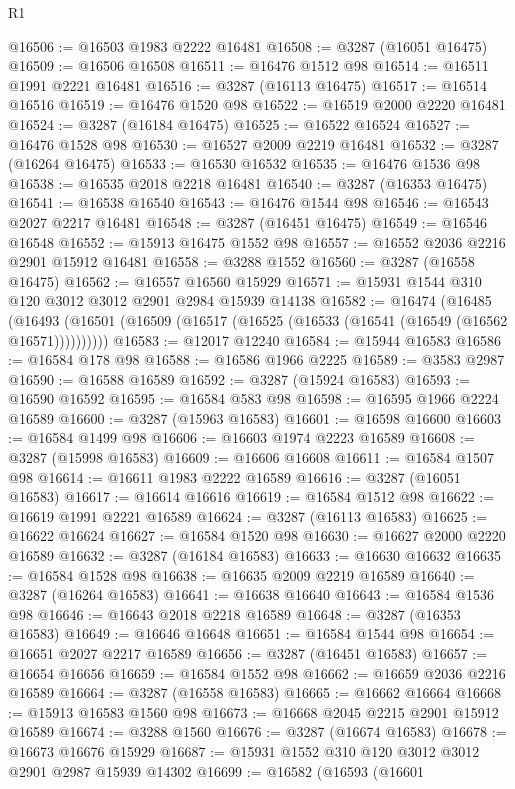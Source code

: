 \begin{lexlean}{R1}
\begin{coremodule}
@16506 := @16503 @1983 @2222 @16481
@16508 := @3287 (@16051 @16475)
@16509 := @16506 @16508
@16511 := @16476 @1512 @98
@16514 := @16511 @1991 @2221 @16481
@16516 := @3287 (@16113 @16475)
@16517 := @16514 @16516
@16519 := @16476 @1520 @98
@16522 := @16519 @2000 @2220 @16481
@16524 := @3287 (@16184 @16475)
@16525 := @16522 @16524
@16527 := @16476 @1528 @98
@16530 := @16527 @2009 @2219 @16481
@16532 := @3287 (@16264 @16475)
@16533 := @16530 @16532
@16535 := @16476 @1536 @98
@16538 := @16535 @2018 @2218 @16481
@16540 := @3287 (@16353 @16475)
@16541 := @16538 @16540
@16543 := @16476 @1544 @98
@16546 := @16543 @2027 @2217 @16481
@16548 := @3287 (@16451 @16475)
@16549 := @16546 @16548
@16552 := @15913 @16475 @1552 @98
@16557 := @16552 @2036 @2216 @2901 @15912 @16481
@16558 := @3288 @1552
@16560 := @3287 (@16558 @16475)
@16562 := @16557 @16560 @15929
@16571 := @15931 @1544 @310 @120 @3012 @3012 @2901 @2984 @15939 @14138
@16582 := @16474
    (@16485 (@16493 (@16501 (@16509 (@16517 (@16525 (@16533 (@16541 (@16549 (@16562 @16571))))))))))
@16583 := @12017 @12240
@16584 := @15944 @16583
@16586 := @16584 @178 @98
@16588 := @16586 @1966 @2225
@16589 := @3583 @2987
@16590 := @16588 @16589
@16592 := @3287 (@15924 @16583)
@16593 := @16590 @16592
@16595 := @16584 @583 @98
@16598 := @16595 @1966 @2224 @16589
@16600 := @3287 (@15963 @16583)
@16601 := @16598 @16600
@16603 := @16584 @1499 @98
@16606 := @16603 @1974 @2223 @16589
@16608 := @3287 (@15998 @16583)
@16609 := @16606 @16608
@16611 := @16584 @1507 @98
@16614 := @16611 @1983 @2222 @16589
@16616 := @3287 (@16051 @16583)
@16617 := @16614 @16616
@16619 := @16584 @1512 @98
@16622 := @16619 @1991 @2221 @16589
@16624 := @3287 (@16113 @16583)
@16625 := @16622 @16624
@16627 := @16584 @1520 @98
@16630 := @16627 @2000 @2220 @16589
@16632 := @3287 (@16184 @16583)
@16633 := @16630 @16632
@16635 := @16584 @1528 @98
@16638 := @16635 @2009 @2219 @16589
@16640 := @3287 (@16264 @16583)
@16641 := @16638 @16640
@16643 := @16584 @1536 @98
@16646 := @16643 @2018 @2218 @16589
@16648 := @3287 (@16353 @16583)
@16649 := @16646 @16648
@16651 := @16584 @1544 @98
@16654 := @16651 @2027 @2217 @16589
@16656 := @3287 (@16451 @16583)
@16657 := @16654 @16656
@16659 := @16584 @1552 @98
@16662 := @16659 @2036 @2216 @16589
@16664 := @3287 (@16558 @16583)
@16665 := @16662 @16664
@16668 := @15913 @16583 @1560 @98
@16673 := @16668 @2045 @2215 @2901 @15912 @16589
@16674 := @3288 @1560
@16676 := @3287 (@16674 @16583)
@16678 := @16673 @16676 @15929
@16687 := @15931 @1552 @310 @120 @3012 @3012 @2901 @2987 @15939 @14302
@16699 := @16582
    (@16593
      (@16601

\end{coremodule}
\end{lexlean}
